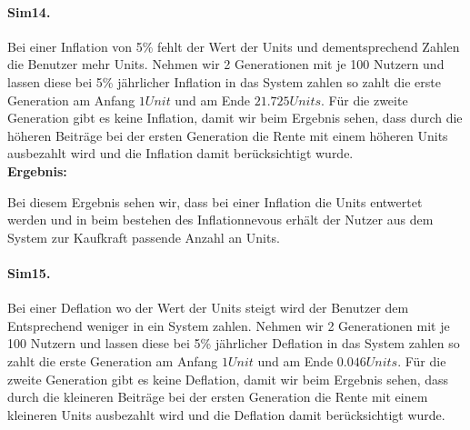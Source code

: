 \paragraph{Sim14.} Bei einer Inflation von 5\% fehlt der Wert der Units und dementsprechend Zahlen die Benutzer mehr Units. Nehmen wir 2 Generationen mit je 100 Nutzern und lassen diese bei 5\% jährlicher Inflation in das System zahlen so zahlt die erste Generation am Anfang $1 Unit$  und am Ende $21.725 Units$. Für die zweite Generation gibt es keine Inflation, damit wir beim Ergebnis sehen, dass durch die höheren Beiträge bei der ersten Generation die Rente mit einem höheren Units ausbezahlt wird und die Inflation damit berücksichtigt wurde. \\

\textbf{Ergebnis:}

\begin{table}[hbt!]
\centering
{}
\end{table}

Bei diesem Ergebnis sehen wir, dass bei einer Inflation die Units entwertet werden und in beim bestehen des Inflationnevous erhält der Nutzer aus dem System zur Kaufkraft passende Anzahl an Units.

\paragraph{Sim15.} Bei einer Deflation wo der Wert der Units steigt wird der Benutzer dem Entsprechend weniger in ein System zahlen. Nehmen wir 2 Generationen mit je 100 Nutzern und lassen diese bei 5\% jährlicher Deflation in das System zahlen so zahlt die erste Generation am Anfang $1 Unit$  und am Ende $0.046 Units$. Für die zweite Generation gibt es keine Deflation, damit wir beim Ergebnis sehen, dass durch die kleineren Beiträge bei der ersten Generation die Rente mit einem kleineren Units ausbezahlt wird und die Deflation damit berücksichtigt wurde. \\

